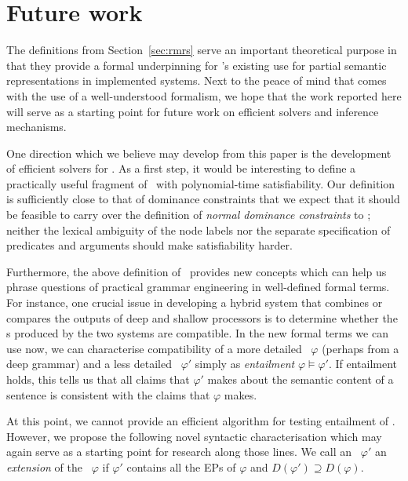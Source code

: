 \section{Future work}
\label{sec:entailment}

The definitions from Section~\ref{sec:rmrs} serve an important
theoretical purpose in that they provide a formal underpinning for \rmrs's
existing use for partial semantic representations in implemented
systems.  Next to the peace of mind that comes with the use of a
well-understood formalism, we hope that the work reported here will
serve as a starting point for future work on efficient solvers and
inference mechanisms.

One direction which we believe may develop from this paper is the
development of efficient solvers for \rmrs.  As a first step, it would
be interesting to define a practically useful fragment of \rmrs\ with
polynomial-time satisfiability.  Our definition is sufficiently close
to that of dominance constraints that we expect that it should be
feasible to carry over the definition of \emph{normal dominance
  constraints} \cite{Althaus_etal:JoA} to \rmrs; neither the lexical
ambiguity of the node labels nor the separate specification of
predicates and arguments should make satisfiability harder.

Furthermore, the above definition of \rmrs\ provides new concepts
which can help us phrase questions of practical grammar engineering in
well-defined formal terms.  For instance, one crucial issue in
developing a hybrid system that combines or compares the outputs of
deep and shallow processors is to determine whether the \rmrs s
produced by the two systems are compatible.  In the new formal terms
we can use now, we can characterise compatibility of a more detailed
\rmrs\ $\varphi$ (perhaps from a deep grammar) and a less detailed
\rmrs\ $\varphi'$ simply as \emph{entailment} $\varphi \models
\varphi'$.  If entailment holds, this tells us that all claims that
$\varphi'$ makes about the semantic content of a sentence is
consistent with the claims that $\varphi$ makes.

At this point, we cannot provide an efficient algorithm for testing
entailment of \rmrs.  However, we propose the following novel
syntactic characterisation which may again serve as a starting point
for research along those lines. We call an \rmrs\ $\varphi'$ an
\emph{extension} of the \rmrs\ $\varphi$ if $\varphi'$ contains all
the EPs of $\varphi$ and $D(\varphi') \supseteq D(\varphi)$.

